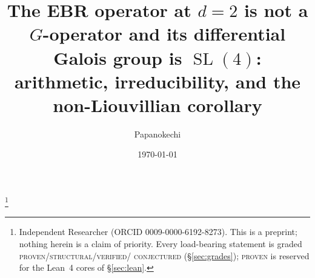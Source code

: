 \documentclass[11pt,reqno]{amsart}
\theoremstyle{plain}
\theoremstyle{definition}
\theoremstyle{remark}
\newcommand{\SL}{\operatorname{SL}}
\begin{document}
\title[The EBR operator at $d=2$ has Galois group $\SL_4$]{The EBR operator
at $d=2$ is not a $G$-operator and its differential Galois group is
$\SL(4)$: arithmetic, irreducibility, and the non-Liouvillian corollary}

\author{Papanokechi}
\thanks{Independent Researcher (ORCID 0009-0000-6192-8273). This is a
preprint; nothing herein is a claim of priority. Every load-bearing statement
is graded \textsc{proven}/\textsc{structural}/\textsc{verified}/%
\textsc{conjectured} (\S\ref{sec:grades}); \textsc{proven} is reserved for
the Lean~4 cores of \S\ref{sec:lean}.}

\date{\today}


\end{document}
